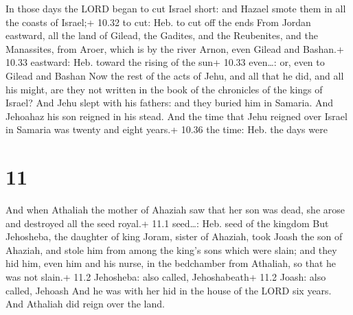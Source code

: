  In those days the LORD began to cut Israel short: and
Hazael smote them in all the coasts of Israel;+ 10.32 to cut: Heb. to
cut off the ends  From Jordan eastward, all the land of
Gilead, the Gadites, and the Reubenites, and the Manassites, from Aroer,
which is by the river Arnon, even Gilead and Bashan.+ 10.33 eastward:
Heb. toward the rising of the sun+ 10.33 even\ldots: or, even to Gilead
and Bashan  Now the rest of the acts of Jehu, and all that
he did, and all his might, are they not written in the book of the
chronicles of the kings of Israel?  And Jehu slept with his
fathers: and they buried him in Samaria. And Jehoahaz his son reigned in
his stead.  And the time that Jehu reigned over Israel in
Samaria was twenty and eight years.+ 10.36 the time: Heb. the days were

\hypertarget{section-10}{%
\section{11}\label{section-10}}

 And when Athaliah the mother of Ahaziah saw that her son
was dead, she arose and destroyed all the seed royal.+ 11.1 seed\ldots:
Heb. seed of the kingdom  But Jehosheba, the daughter of
king Joram, sister of Ahaziah, took Joash the son of Ahaziah, and stole
him from among the king's sons which were slain; and they hid him, even
him and his nurse, in the bedchamber from Athaliah, so that he was not
slain.+ 11.2 Jehosheba: also called, Jehoshabeath+ 11.2 Joash: also
called, Jehoash  And he was with her hid in the house of the
LORD six years. And Athaliah did reign over the land.

